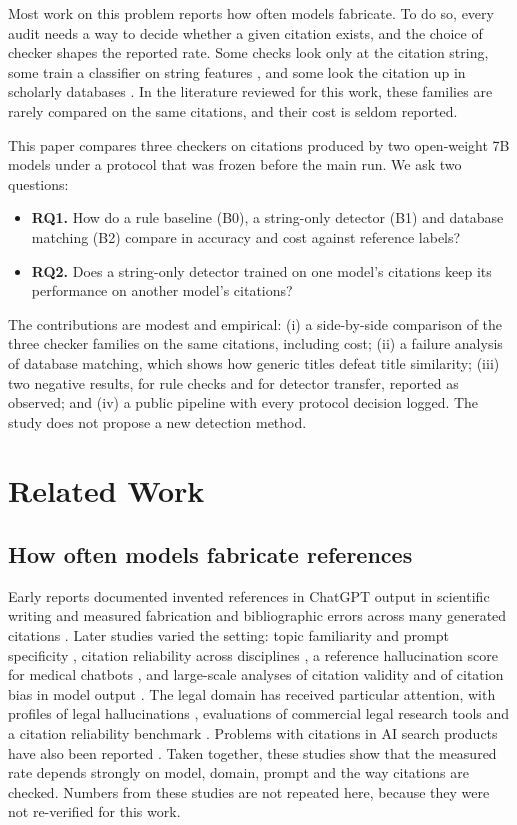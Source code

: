 \documentclass[10pt,twocolumn]{article}
\begin{document}
Most work on this problem reports how often models fabricate. To do so, every audit needs a way to decide whether a given citation exists, and the choice of checker shapes the reported rate. Some checks look only at the citation string, some train a classifier on string features \citep{naser2026}, and some look the citation up in scholarly databases \citep{rao2026}. In the literature reviewed for this work, these families are rarely compared on the same citations, and their cost is seldom reported.

This paper compares three checkers on citations produced by two open-weight 7B models under a protocol that was frozen before the main run. We ask two questions:
\begin{itemize}[leftmargin=*,itemsep=1pt,topsep=2pt]
\item \textbf{RQ1.} How do a rule baseline (B0), a string-only detector (B1) and database matching (B2) compare in accuracy and cost against reference labels?
\item \textbf{RQ2.} Does a string-only detector trained on one model's citations keep its performance on another model's citations?
\end{itemize}
The contributions are modest and empirical: (i) a side-by-side comparison of the three checker families on the same citations, including cost; (ii) a failure analysis of database matching, which shows how generic titles defeat title similarity; (iii) two negative results, for rule checks and for detector transfer, reported as observed; and (iv) a public pipeline with every protocol decision logged. The study does not propose a new detection method.

\section{Related Work}
\subsection{How often models fabricate references}
Early reports documented invented references in ChatGPT output in scientific writing \citep{alkaissi2023} and measured fabrication and bibliographic errors across many generated citations \citep{walters2023}. Later studies varied the setting: topic familiarity and prompt specificity \citep{linardon2025}, citation reliability across disciplines \citep{mugaanyi2024}, a reference hallucination score for medical chatbots \citep{aljamaan2024}, and large-scale analyses of citation validity \citep{xu2026} and of citation bias in model output \citep{algaba2024}. The legal domain has received particular attention, with profiles of legal hallucinations \citep{dahl2024}, evaluations of commercial legal research tools \citep{magesh2025} and a citation reliability benchmark \citep{chen2026}. Problems with citations in AI search products have also been reported \citep{jazwinska2025}. Taken together, these studies show that the measured rate depends strongly on model, domain, prompt and the way citations are checked. Numbers from these studies are not repeated here, because they were not re-verified for this work.
\end{document}
